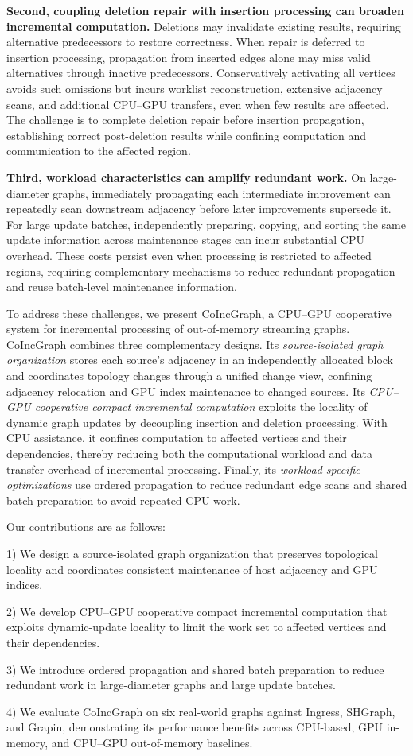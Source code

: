 \textbf{Second, coupling deletion repair with insertion processing can broaden incremental computation.}
Deletions may invalidate existing results, requiring alternative predecessors to restore correctness. When repair is deferred to insertion processing, propagation from inserted edges alone may miss valid alternatives through inactive predecessors. Conservatively activating all vertices avoids such omissions but incurs worklist reconstruction, extensive adjacency scans, and additional CPU--GPU transfers, even when few results are affected. The challenge is to complete deletion repair before insertion propagation, establishing correct post-deletion results while confining computation and communication to the affected region.

\textbf{Third, workload characteristics can amplify redundant work.}
On large-diameter graphs, immediately propagating each intermediate improvement can repeatedly scan downstream adjacency before later improvements supersede it. For large update batches, independently preparing, copying, and sorting the same update information across maintenance stages can incur substantial CPU overhead. These costs persist even when processing is restricted to affected regions, requiring complementary mechanisms to reduce redundant propagation and reuse batch-level maintenance information.

To address these challenges, we present CoIncGraph, a CPU--GPU cooperative system for incremental processing of out-of-memory streaming graphs. CoIncGraph combines three complementary designs. Its \textit{source-isolated graph organization} stores each source's adjacency in an independently allocated block and coordinates topology changes through a unified change view, confining adjacency relocation and GPU index maintenance to changed sources. Its \textit{CPU--GPU cooperative compact incremental computation} exploits the locality of dynamic graph updates by decoupling insertion and deletion processing. With CPU assistance, it confines computation to affected vertices and their dependencies, thereby reducing both the computational workload and data transfer overhead of incremental processing. Finally, its \textit{workload-specific optimizations} use ordered propagation to reduce redundant edge scans and shared batch preparation to avoid repeated CPU work.

Our contributions are as follows:

1) We design a source-isolated graph organization that preserves topological locality and coordinates consistent maintenance of host adjacency and GPU indices.

2) We develop CPU--GPU cooperative compact incremental computation that exploits dynamic-update locality to limit the work set to affected vertices and their dependencies.

3) We introduce ordered propagation and shared batch preparation to reduce redundant work in large-diameter graphs and large update batches.

4) We evaluate CoIncGraph on six real-world graphs against Ingress, SHGraph, and Grapin, demonstrating its performance benefits across CPU-based, GPU in-memory, and CPU--GPU out-of-memory baselines.
